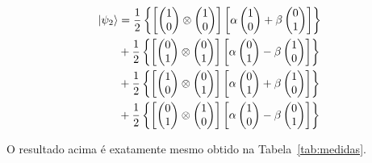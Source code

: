 \begin{equation}\label{eq:final}
  \begin{split}
\ket{\psi_2} &=\frac{1}{2} \left\{ \left[\begin{pmatrix}
1 \\
0
\end{pmatrix} \otimes \begin{pmatrix}
1 \\
0
\end{pmatrix}\right] \left[\alpha \begin{pmatrix}
1 \\
0
\end{pmatrix} + \beta \begin{pmatrix}
0 \\
1
\end{pmatrix}\right]\right\} \nonumber \\
&+\frac{1}{2} \left\{ \left[\begin{pmatrix}
0 \\
1
\end{pmatrix} \otimes \begin{pmatrix}
0 \\
1
\end{pmatrix}\right] \left[\alpha \begin{pmatrix}
0 \\
1
\end{pmatrix} - \beta \begin{pmatrix}
1 \\
0
\end{pmatrix}\right]\right\} \nonumber \\
&+\frac{1}{2} \left\{\left[ \begin{pmatrix}
1 \\
0
\end{pmatrix} \otimes \begin{pmatrix}
0 \\
1
\end{pmatrix}\right] \left[\alpha \begin{pmatrix}
0 \\
1
\end{pmatrix} + \beta \begin{pmatrix}
1 \\
0
\end{pmatrix}\right]\right\} \nonumber \\
&+\frac{1}{2} \left\{ \left[ \begin{pmatrix}
0 \\
1
\end{pmatrix} \otimes \begin{pmatrix}
1 \\
0
\end{pmatrix}\right] \left[\alpha \begin{pmatrix}
1 \\
0
\end{pmatrix} - \beta \begin{pmatrix}
0 \\
1
\end{pmatrix}\right] \right\}
  \end{split}
\end{equation}

O resultado acima é exatamente mesmo obtido na Tabela~\ref{tab:medidas}.

\clearpage

